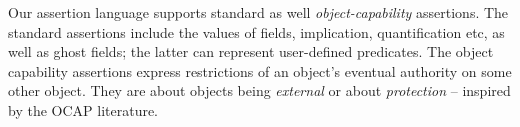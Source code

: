 

\label{sub:SpecO}


Our assertion language %
{supports} standard  as well \emph{object-capability} assertions. 
 The  standard assertions  include the values of fields, implication, quantification etc, as well as ghost fields; the latter can represent user-defined predicates. 
The  object capability assertions express restrictions of an object's eventual authority on some other object.
{They are about objects being
\emph{external} or about   \emph{protection} -- inspired by the OCAP literature.}




